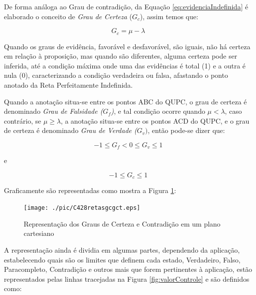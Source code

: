 De forma análoga ao Grau de contradição, da Equação \ref{eq:evidenciaIndefinida} é elaborado o conceito de \emph{Grau de Certeza} ($G _c$), assim temos que: 

\begin{center}
\begin{equation}
G _{c} = \mu - \lambda
\label{eq:grauCerteza}
\end{equation}
\end{center}

Quando os graus de evidência, favorável e desfavorável, são iguais, não há certeza em relação à proposição, mas quando são diferentes, alguma certeza pode ser inferida, até a condição máxima onde uma das evidências é total (1) e a outra é nula (0), caracterizando a condição verdadeira ou falsa, afastando o ponto anotado da Reta Perfeitamente Indefinida. 

Quando a anotação situa-se entre os pontos ABC do QUPC, o grau de certeza é denominado \emph{Grau de Falsidade ($G _f$)}, e tal condição ocorre quando $\mu < \lambda $, caso contrário, se $\mu \ge \lambda $, a anotação situa-se entre os pontos ACD do QUPC, e o grau de certeza é denominado \emph{Grau de Verdade ($G _v)$}, então pode-se dizer que:

\begin{center}
\begin{equation}
-1 \le G _{f}  <  0 \le G _{v} \le 1
\label{eq:grauVerdadeFalsidade}
\end{equation}
\end{center}
e
\begin{center}
\begin{equation}
-1 \le G _{c} \le 1
\label{eq:grauCertezaIntervalo}
\end{equation}
\end{center}


Graficamente são representadas como mostra a Figura \ref{fig:retasgcgct}:

\begin{figure}[!htb]
\center\texttt{[image: ./pic/C428retasgcgct.eps]}
\caption{Representação dos Graus de Certeza e Contradição em um plano cartesiano}
\label{fig:retasgcgct}
\end{figure}

A representação ainda é dividia em algumas partes, dependendo da aplicação, estabelecendo quais são os limites que definem cada estado, Verdadeiro, Falso, Paracompleto, Contradição e outros mais que forem pertinentes à aplicação, estão representados pelas linhas tracejadas na Figura \ref{fig:valorControle} e são definidos como:

